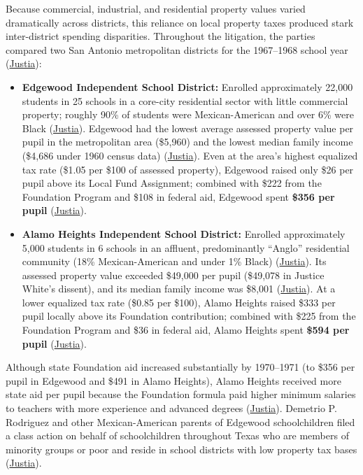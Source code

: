 \documentclass[12pt]{article}
\begin{document}
Because commercial, industrial, and residential property values varied dramatically across districts, this reliance on local property taxes produced stark inter-district spending disparities. Throughout the litigation, the parties compared two San Antonio metropolitan districts for the 1967--1968 school year (\href{https://supreme.justia.com/cases/federal/us/411/1/}{Justia}):
\begin{itemize}
\item \textbf{Edgewood Independent School District:} Enrolled approximately 22,000 students in 25 schools in a core-city residential sector with little commercial property; roughly 90\% of students were Mexican-American and over 6\% were Black (\href{https://supreme.justia.com/cases/federal/us/411/1/}{Justia}). Edgewood had the lowest average assessed property value per pupil in the metropolitan area (\$5,960) and the lowest median family income (\$4,686 under 1960 census data) (\href{https://supreme.justia.com/cases/federal/us/411/1/}{Justia}). Even at the area's highest equalized tax rate (\$1.05 per \$100 of assessed property), Edgewood raised only \$26 per pupil above its Local Fund Assignment; combined with \$222 from the Foundation Program and \$108 in federal aid, Edgewood spent \textbf{\$356 per pupil} (\href{https://supreme.justia.com/cases/federal/us/411/1/}{Justia}).
\item \textbf{Alamo Heights Independent School District:} Enrolled approximately 5,000 students in 6 schools in an affluent, predominantly ``Anglo'' residential community (18\% Mexican-American and under 1\% Black) (\href{https://supreme.justia.com/cases/federal/us/411/1/}{Justia}). Its assessed property value exceeded \$49,000 per pupil (\$49,078 in Justice White's dissent), and its median family income was \$8,001 (\href{https://supreme.justia.com/cases/federal/us/411/1/}{Justia}). At a lower equalized tax rate (\$0.85 per \$100), Alamo Heights raised \$333 per pupil locally above its Foundation contribution; combined with \$225 from the Foundation Program and \$36 in federal aid, Alamo Heights spent \textbf{\$594 per pupil} (\href{https://supreme.justia.com/cases/federal/us/411/1/}{Justia}).
\end{itemize}

Although state Foundation aid increased substantially by 1970--1971 (to \$356 per pupil in Edgewood and \$491 in Alamo Heights), Alamo Heights received more state aid per pupil because the Foundation formula paid higher minimum salaries to teachers with more experience and advanced degrees (\href{https://supreme.justia.com/cases/federal/us/411/1/}{Justia}). Demetrio P. Rodriguez and other Mexican-American parents of Edgewood schoolchildren filed a class action on behalf of schoolchildren throughout Texas who are members of minority groups or poor and reside in school districts with low property tax bases (\href{https://supreme.justia.com/cases/federal/us/411/1/}{Justia}).
\end{document}
